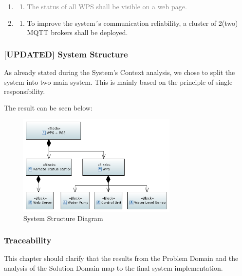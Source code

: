 \documentclass[11pt]{article}
\begin{document}
\begin{enumerate}[leftmargin=4em, font=\small, label=\textbf{SR-\arabic*}]
	\item	
		\begin{enumerate}[leftmargin=1.5em, font=\small, label=\textbf{.\arabic*:}]
		\setlength\itemsep{0em}
		\item \textcolor{gray}{The status of all WPS shall be visible on a web page.}
		\end{enumerate}

	\item
		\begin{enumerate}[leftmargin=1.5em, font=\small, label=\textbf{.\arabic*:}]
		\setlength\itemsep{0em}
		\item To improve the system´s communication reliability, a cluster of 2(two) MQTT brokers shall be deployed.
		\end{enumerate}

\end{enumerate}

\subsubsection{[UPDATED] System Structure}

As already stated during the System's Context analysis, we chose to split the system into two main system. This is mainly based on the principle of single responsibility.

The result can be seen below:

\begin{figure}[H]
  \centering
  \includegraphics[width=300px]{../diagrams/system-structure.png}
  \caption{System Structure Diagram}
  \label{fig:System Structure Diagram}
\end{figure}

\subsubsection{Traceability}

This chapter should clarify that the results from the Problem Domain and the analysis of the Solution Domain map to the final system implementation.
\end{document}
